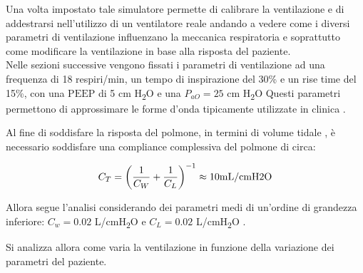 Una volta impostato tale simulatore permette di calibrare la ventilazione e di addestrarsi nell'utilizzo di un ventilatore reale andando a vedere come i diversi parametri di ventilazione influenzano la meccanica respiratoria e soprattutto come modificare la ventilazione in base alla risposta del paziente.
\\

Nelle sezioni successive vengono fissati i parametri di ventilazione \cite{truwit_modes_2011} ad una frequenza di 18 respiri/min, un tempo di inspirazione del 30\% e un rise time del 15\%, con una $\mathrm{PEEP}$ di 5 cm H\textsubscript{2}O e una $P_{aO}=25$  cm H\textsubscript{2}O Questi parametri permettono di approssimare le forme d'onda tipicamente utilizzate in clinica \cite{al-naggar_modelling_2015}. 

Al fine di soddisfare la risposta del polmone, in termini di volume tidale \cite{ventilation_2000}, è necessario soddisfare una compliance complessiva del polmone di circa:

\begin{equation}
	C_{T}=\left({1 \over C_{W}}+{1 \over C_{L}}\right)^{-1}\approx 10 \text{mL/cmH2O}
\end{equation}

Allora segue l'analisi considerando dei parametri medi di un'ordine di grandezza inferiore: $C_w=0.02$ L/cmH\textsubscript{2}O e $C_L=0.02$ L/cmH\textsubscript{2}O .

Si analizza allora come varia la ventilazione in funzione della variazione dei parametri del paziente. 

